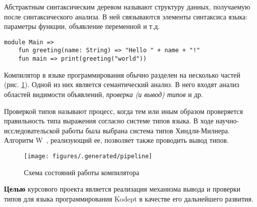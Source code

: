 Абстрактным синтаксическим деревом называют структуру данных, получаемую после синтаксического анализа.
В ней связываются элементы синтаксиса языка: параметры функции, объявление переменной и т.д.

\begin{lstlisting}[label={lst:syntax},caption={Демонстрация синтаксиса языка Kodept}]
    module Main =>
    fun greeting(name: String) => "Hello " + name + "!"
    fun main => print(greeting("world"))
\end{lstlisting}

Компилятор в языке программирования обычно разделен на несколько частей (рис. \ref{fig:pipeline}).
Одной из них является семантический анализ.
В него входят анализ областей видимости объявлений, \textit{проверка (и вывод) типов} и др.

Проверкой типов называют процесс, когда тем или иным образом проверяется правильность типа выражения согласно системе типов языка.
В ходе научно-исследовательской работы была выбрана система типов Хиндли-Милнера.
Алгоритм W~\cite{UrbanN2009}, реализующий ее, позволяет также проводить вывод типов.

\begin{figure}[H]
    \centering
    \texttt{[image: figures/.generated/pipeline]}
    \caption{Схема состояний работы компилятора}
    \label{fig:pipeline}
\end{figure}

\textbf{Целью} курсового проекта является реализация механизма вывода и проверки типов для языка программирования Kodept в качестве его дальнейшего развития.

